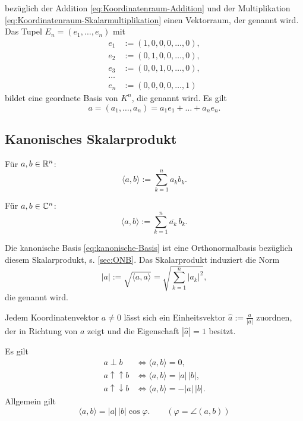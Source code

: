 bezüglich der Addition \eqref{eq:Koordinatenraum-Addition}
und der Multiplikation \eqref{eq:Koordinatenraum-Skalarmultiplikation}
einen Vektorraum, der  genannt wird.
Das Tupel $E_n=(e_1,\ldots,e_n)$ mit
\begin{equation}\label{eq:kanonische-Basis}
\begin{split}
e_1 &:= (1,0,0,0,\ldots, 0),\\
e_2 &:= (0,1,0,0,\ldots, 0),\\
e_3 &:= (0,0,1,0,\ldots, 0),\\
\ldots\\
e_n &:= (0,0,0,0,\ldots, 1)
\end{split}
\end{equation}
bildet eine geordnete Basis von $K^n$, die 
genannt wird. Es gilt
\begin{equation}
a = (a_1,\ldots,a_n) = a_1 e_1+\ldots+a_n e_n.
\end{equation}

\newpage
\subsection{Kanonisches Skalarprodukt}
\begin{definition}
Für $a,b\in\mathbb R^n$:
\begin{equation}
\langle a,b\rangle := \sum_{k=1}^n a_k b_k.
\end{equation}

Für $a,b\in\mathbb C^n$:
\begin{equation}
\langle a,b\rangle := \sum_{k=1}^n \overline{a_k}\,b_k.
\end{equation}
\end{definition}
\noindent
Die kanonische Basis \eqref{eq:kanonische-Basis} ist eine
Orthonormalbasis bezüglich diesem Skalarprodukt, s. \ref{sec:ONB}.
Das Skalarprodukt induziert die Norm
\begin{equation}
|a| := \sqrt{\langle a,a\rangle} = \sqrt{\textstyle \sum_{k=1}^n |a_k|^2},
\end{equation}
die  genannt wird.

Jedem Koordinatenvektor $a\ne 0$ lässt sich ein Einheitsvektor
$\hat a:=\frac{a}{|a|}$ zuordnen, der in Richtung von $a$ zeigt
und die Eigenschaft $|\hat a|=1$ besitzt.

Es gilt
\begin{align}
a\perp b &\iff \langle a,b\rangle=0,\\
a\uparrow\uparrow b &\iff \langle a,b\rangle = |a|\,|b|,\\
a\uparrow\downarrow b &\iff \langle a,b\rangle = -|a|\,|b|.
\end{align}
Allgemein gilt
\begin{equation}
\langle a,b\rangle = |a|\,|b|\cos\varphi.\qquad(\varphi=\angle (a,b))
\end{equation}

